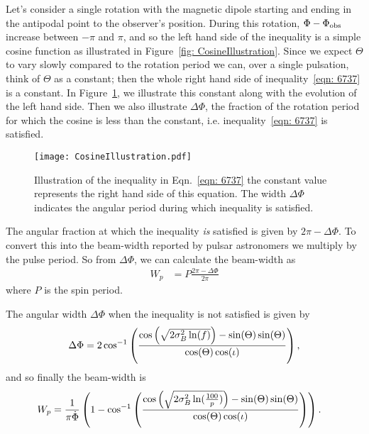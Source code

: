 \documentclass[../full_thesis/full_thesis.tex]{subfiles}
\begin{document}
Let's consider a single rotation with the magnetic dipole starting and ending in
the antipodal point to the observer's position. During this rotation, $\Phi -
\Phi_{\mathrm{obs}}$ increase between $-\pi$ and $\pi$, and so the left hand side of the
inequality is a simple cosine function as illustrated in Figure~\ref{fig:
CosineIllustration}.  Since we expect $\Theta$ to vary slowly compared to the
rotation period we can, over a single pulsation, think of $\Theta$ as a
constant; then the whole right hand side of inequality~\eqref{eqn: 6737} is a
constant. In Figure~\ref{fig: CosineIllustration}, we illustrate this constant
along with the evolution of the left hand side. Then we also illustrate $\Delta\Phi$,
the fraction of the rotation period for which the cosine is less than the
constant, i.e. inequality~\eqref{eqn: 6737} is satisfied.
\begin{figure}[ht]
\centering
\texttt{[image: CosineIllustration.pdf]}
\caption{Illustration of the inequality in Eqn.~\eqref{eqn: 6737} the constant
         value represents the right hand side of this equation. The
         width $\Delta\Phi$ indicates the angular period during which inequality
         is satisfied.}
\label{fig: CosineIllustration}
\end{figure}

The angular fraction at which the inequality \emph{is} satisfied is given by
$2\pi - \Delta\Phi$. To convert this into the beam-width reported by pulsar
astronomers we multiply by the pulse period. So from $\Delta\Phi$, we can
calculate the beam-width as
\begin{align}
    W_{p} & = P \frac{2\pi - \Delta\Phi}{2\pi}
\end{align}
where $P$ is the spin period.

The angular width $\Delta\Phi$ when the inequality is not satisfied is given by
\begin{equation}
    \Delta\Phi = 2\cos^{-1}\left(
                \frac{\cos\left(\sqrt{2\sigma_{B}^{2} \ln(f)}\right) - \sin(\Theta)\sin(\Theta)}
                          {\cos(\Theta)\cos(\iota)}
                      \right),
\end{equation}
and so finally the beam-width is
\begin{align}
    W_{p} & = \frac{1}{\pi \dot{\Phi}}\left(1 -
               \cos^{-1}\left(
                   \frac{\cos\left(\sqrt{2\sigma_{B}^{2} \ln(\frac{100}{p})}\right) - \sin(\Theta)\sin(\Theta)}
                          {\cos(\Theta)\cos(\iota)}
                      \right)
                  \right).
\label{eqn: Wp}
\end{align}
\end{document}
